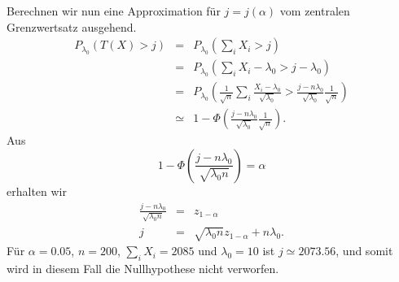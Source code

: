 Berechnen wir nun eine Approximation für $j=j(\alpha)$ vom zentralen Grenzwertsatz ausgehend.
\begin{eqnarray}
    P_{\lambda_0} \left( T(X) > j \right) &=& P_{\lambda_0} \left( \sum_{i}^{} X_i > j \right) \\
    &=& P_{\lambda_0} \left( \sum_{i}^{} X_i -\lambda_0 > j - \lambda_0 \right) \\
    &=& P_{\lambda_0} \left( \frac{1}{\sqrt{n}} \sum_{i}^{} \frac{ X_i - \lambda_0}{ \sqrt{\lambda_0}} > \frac{j-n\lambda_0}{\sqrt{\lambda_0}}\frac{1}{\sqrt{n}} \right) \\
    &\simeq& 1-\Phi \left( \frac{j-n\lambda_0}{\sqrt{\lambda_0}}\frac{1}{\sqrt{n}}  \right). 
\end{eqnarray}
Aus
\begin{equation}
    1-\Phi \left( \frac{j-n\lambda_0}{\sqrt{\lambda_0 n}} \right) = \alpha
\end{equation}
erhalten wir
\begin{eqnarray}
    \frac{j-n\lambda_0}{\sqrt{\lambda_0 n}} &=&  z_{1-\alpha} \\
    j &=&  \sqrt{\lambda_0 n} z_{1-\alpha} + n\lambda_0.
\end{eqnarray}
Für $\alpha=0.05$, $n=200$, $\sum_{i}^{}X_i=2085$ und $\lambda_0=10$ ist $j\simeq 2073.56$,
und somit wird in diesem Fall die Nullhypothese nicht verworfen.









